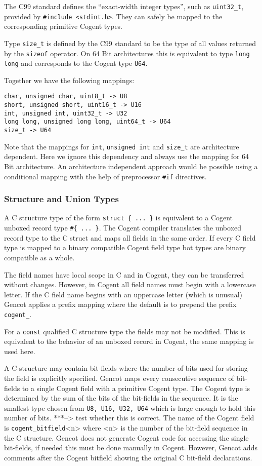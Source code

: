 \documentclass[a4paper]{report}
\newcommand{\code}[1]{\textnormal{\texttt{#1}}}
\begin{document}
The C99 standard defines the ``exact-width integer types'', such as \code{uint32\_t}, provided by \code{\#include <stdint.h>}. They can safely be mapped to the corresponding primitive Cogent types. 

Type \code{size\_t} is defined by the C99 standard to be the type of all values returned by the \code{sizeof} operator.
On 64 Bit architectures this is equivalent to type \code{long long} and corresponds to the Cogent type \code{U64}.

Together we have the following mappings:
\begin{verbatim}
char, unsigned char, uint8_t -> U8
short, unsigned short, uint16_t -> U16
int, unsigned int, uint32_t -> U32
long long, unsigned long long, uint64_t -> U64
size_t -> U64
\end{verbatim}

Note that the mappings for \code{int}, \code{unsigned int} and \code{size\_t} are architecture dependent. 
Here we ignore this dependency and always use the mapping for 64 Bit architecture. An architecture independent 
approach would be possible using a conditional mapping with the help of preprocessor \code{\#if} directives.

\subsubsection{Structure and Union Types}
\label{design-types-struct}

A C structure type of the form \code{struct \{ ... \}} is equivalent to a Cogent unboxed record type \code{\#\{ ... \}}.
The Cogent compiler translates the unboxed record type to the C struct and maps all fields in the same order.
If every C field type is mapped to a binary compatible Cogent field type bot types are binary compatible as a whole.

The field names have local scope in C and in Cogent, they can be transferred without changes. However, in Cogent
all field names must begin with a lowercase letter. If the C field name begins with an uppercase letter (which is
unusual) Gencot applies a prefix mapping where the default is to prepend the prefix \code{cogent\_}.

For a \code{const} qualified C structure type the fields may not be modified. This is equivalent to the behavior
of an unboxed record in Cogent, the same mapping is used here.

A C structure may contain bit-fields where the number of bits used for storing the field is explicitly specified.
Gencot maps every consecutive sequence of bit-fields to a single Cogent field with a primitive Cogent type.
The Cogent type is determined by the sum of the bits of the bit-fields in the sequence. It is the smallest 
type chosen from \code{U8, U16, U32, U64} which is large enough to hold this number of bits. 
***--> test whether this is correct.
The name of the
Cogent field is \code{cogent\_bitfield}<n> where <n> is the number of the bit-field sequence in the C structure.
Gencot does not generate Cogent code for accessing the single bit-fields, if needed this must be done manually in Cogent.
However, Gencot adds comments after the Cogent bitfield showing the original C bit-field declarations.
\end{document}
